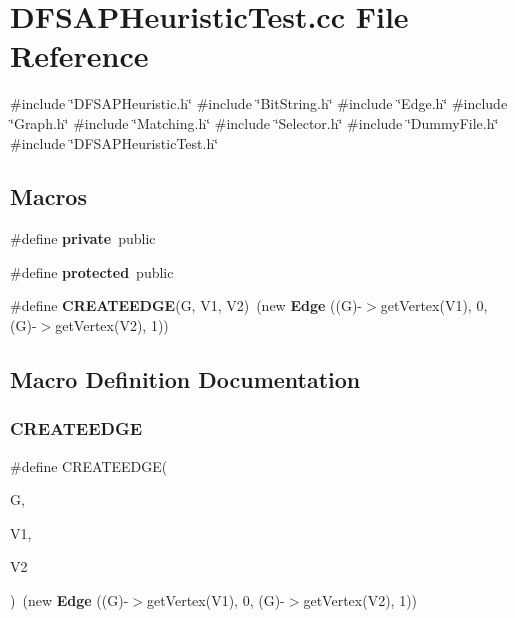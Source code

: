 \section{D\+F\+S\+A\+P\+Heuristic\+Test.\+cc File Reference}
\label{DFSAPHeuristicTest_8cc}
{\ttfamily \#include \char`\"{}D\+F\+S\+A\+P\+Heuristic.\+h\char`\"{}}\newline
{\ttfamily \#include \char`\"{}Bit\+String.\+h\char`\"{}}\newline
{\ttfamily \#include \char`\"{}Edge.\+h\char`\"{}}\newline
{\ttfamily \#include \char`\"{}Graph.\+h\char`\"{}}\newline
{\ttfamily \#include \char`\"{}Matching.\+h\char`\"{}}\newline
{\ttfamily \#include \char`\"{}Selector.\+h\char`\"{}}\newline
{\ttfamily \#include \char`\"{}Dummy\+File.\+h\char`\"{}}\newline
{\ttfamily \#include \char`\"{}D\+F\+S\+A\+P\+Heuristic\+Test.\+h\char`\"{}}\newline
\subsection*{Macros}
\begin{DoxyCompactItemize}
\item 
\#define \textbf{ private}~public
\item 
\#define \textbf{ protected}~public
\item 
\#define \textbf{ C\+R\+E\+A\+T\+E\+E\+D\+GE}(G,  V1,  V2)~(new \textbf{ Edge} ((G)-\/$>$get\+Vertex(V1), 0, (G)-\/$>$get\+Vertex(V2), 1))
\end{DoxyCompactItemize}


\subsection{Macro Definition Documentation}
\mbox{\label{DFSAPHeuristicTest_8cc_a52ddf6d2de5e99f66a5609f59b8f13fd}} 
\subsubsection{C\+R\+E\+A\+T\+E\+E\+D\+GE}
{\footnotesize\ttfamily \#define C\+R\+E\+A\+T\+E\+E\+D\+GE(\begin{DoxyParamCaption}\item[{}]{G,  }\item[{}]{V1,  }\item[{}]{V2 }\end{DoxyParamCaption})~(new \textbf{ Edge} ((G)-\/$>$get\+Vertex(V1), 0, (G)-\/$>$get\+Vertex(V2), 1))}

